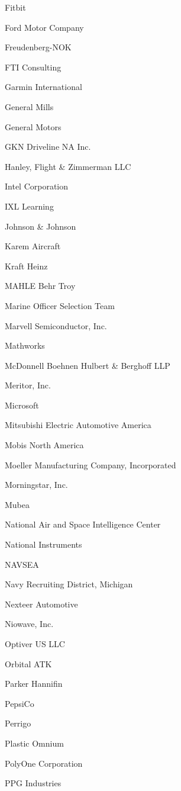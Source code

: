 \documentclass[twoside]{article}
\begin{document}
\begin{center}
\begin{multicols}{5}
\begin{FlushLeft}
\begin{compactitem}
\item Fitbit
\item Ford Motor Company
\item Freudenberg-NOK
\item FTI Consulting
\item Garmin International
\item General Mills
\item General Motors
\item GKN Driveline NA Inc.
\item Hanley, Flight \& Zimmerman LLC
\item Intel Corporation
\item IXL Learning
\item Johnson \& Johnson
\item Karem Aircraft
\item Kraft Heinz
\item MAHLE Behr Troy
\item Marine Officer Selection Team
\item Marvell Semiconductor, Inc.
\item Mathworks
\item McDonnell Boehnen Hulbert \& Berghoff LLP
\item Meritor, Inc.
\item Microsoft
\item Mitsubishi Electric Automotive America
\item Mobis North America
\item Moeller Manufacturing Company, Incorporated
\item Morningstar, Inc.
\item Mubea
\item National Air and Space Intelligence Center
\item National Instruments
\item NAVSEA
\item Navy Recruiting District, Michigan
\item Nexteer Automotive
\item Niowave, Inc.
\item Optiver US LLC
\item Orbital ATK
\item Parker Hannifin
\item PepsiCo
\item Perrigo
\item Plastic Omnium
\item PolyOne Corporation
\item PPG Industries

\end{compactitem}
\end{FlushLeft}
\end{multicols}
\end{center}
\end{document}
